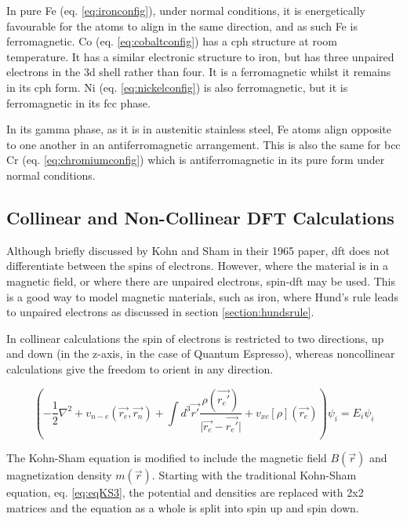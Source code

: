 In pure \Gls{Fe} (eq. \ref{eq:ironconfig}), under normal conditions, it is energetically favourable for the atoms to align in the same direction, and as such \Gls{Fe} is ferromagnetic.  \Gls{Co} (eq. \ref{eq:cobaltconfig}) has a \acrlong{cph} structure at room temperature.  It has a similar electronic structure to iron, but has three unpaired electrons in the 3d shell rather than four.  It is a ferromagnetic whilst it remains in its \acrshort{cph} form.  \Gls{Ni} (eq. \ref{eq:nickelconfig}) is also ferromagnetic, but it is ferromagnetic in its \acrshort{fcc} phase.

In its gamma phase, as it is in austenitic stainless steel, \Gls{Fe} atoms align opposite to one another in an antiferromagnetic arrangement.  This is also the same for \acrshort{bcc} \Gls{Cr} (eq. \ref{eq:chromiumconfig})  which is antiferromagnetic in its pure form under normal conditions.

 





\subsection{Collinear and Non-Collinear DFT Calculations}

Although briefly discussed by Kohn and Sham in their 1965 paper\cite{kohnsham}, \acrshort{dft} does not differentiate between the spins of electrons.  However, where the material is in a magnetic field, or where there are unpaired electrons, spin-\acrshort{dft} may be used.  This is a good way to model magnetic materials, such as iron, where Hund's rule leads to unpaired electrons as discussed in section \ref{section:hundsrule}.  

In collinear calculations the spin of electrons is restricted to two directions, up and down (in the z-axis, in the case of Quantum Espresso), whereas noncollinear calculations give the freedom to orient in any direction. 

\begin{equation}
\left( -\frac{1}{2} \nabla^2 + v_{n-e}(\vec{r_e}, \vec{r_n}) + \int d^3\vec{r'} \frac{\rho(\vec{r_{e}'})}{\lvert \vec{r_{e}} - \vec{r_{e}'} \rvert } + v_{xc}[\rho](\vec{r_{e}}) \right) \psi_{i} = E_{i} \psi_{i}
\label{eq:eqKS3}
\end{equation}

The Kohn-Sham equation is modified to include the magnetic field $B(\vec{r})$ and magnetization density $m(\vec{r})$\cite{spindft1}\cite{spindft2}.  Starting with the traditional Kohn-Sham equation, eq. \ref{eq:eqKS3}, the potential and densities are replaced with 2x2 matrices and the equation as a whole is split into spin up and spin down.

